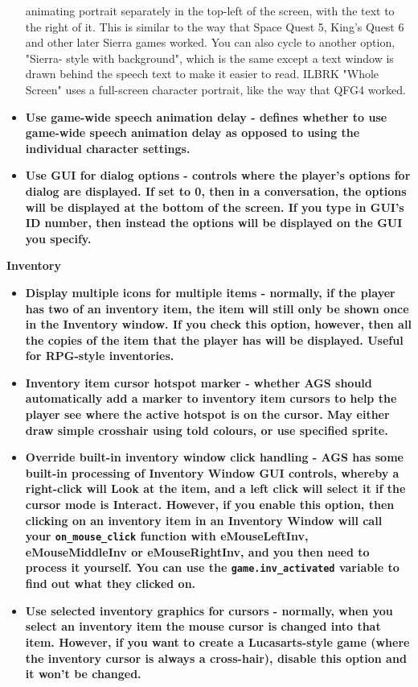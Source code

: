 \begin{itemize}
animating portrait separately in the top-left of the screen, with the text to the right of it.
This is similar to the way that Space Quest 5, King's Quest 6 and other
later Sierra games worked. You can also cycle to another option, "Sierra-
style with background", which is the same except a text window is drawn
behind the speech text to make it easier to read. ILBRK
"Whole Screen" uses a full-screen character portrait, like the way that QFG4 worked.
\item \bf{Use game-wide speech animation delay} - defines whether to use game-wide speech animation delay as opposed to using the individual character settings.
\item \bf{Use GUI for dialog options} - controls where the player's options for dialog are
displayed. If set to 0, then in a conversation, the options
will be displayed at the bottom of the screen. If you type in GUI's ID number, then
instead the options will be displayed on the GUI you specify.
\end{itemize}

\bf{Inventory}
\begin{itemize}
\item \bf{Display multiple icons for multiple items} - normally, if the player has
two of an inventory item, the item will still only be shown once in the Inventory window.
If you check this option, however, then all the copies of the item that the player has
will be displayed. Useful for RPG-style inventories.
\item \bf{Inventory item cursor hotspot marker} - whether AGS should automatically add a marker to inventory item cursors to help the player see where the active hotspot is on the cursor. May either draw simple crosshair using told colours, or use specified sprite.
\item \bf{Override built-in inventory window click handling} - AGS has some built-in processing
of Inventory Window GUI controls, whereby a right-click will Look at the item, and a left click
will select it if the cursor mode is Interact. However, if you enable this
option, then clicking on an inventory item in an Inventory Window will call your \verb$on_mouse_click$
function  with eMouseLeftInv, eMouseMiddleInv or eMouseRightInv, and you then need to process it
yourself. You can use the \verb$game.inv_activated$ variable to find out what they clicked on.
\item \bf{Use selected inventory graphics for cursors} - normally, when you select an inventory
item the mouse cursor is changed into that item. However, if you want to
create a Lucasarts-style game (where the inventory cursor is always a
cross-hair), disable this option and it won't be changed.
\end{itemize}

